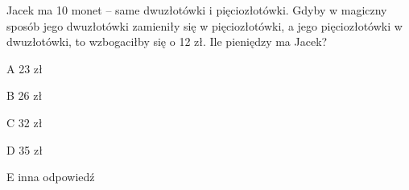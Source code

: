 \begin{tresc}
Jacek ma 10 monet – same dwuzłotówki i pięciozłotówki. Gdyby w magiczny sposób jego dwuzłotówki zamieniły się w pięciozłotówki, a jego pięciozłotówki w dwuzłotówki, to wzbogaciłby się o 12 zł. Ile pieniędzy ma Jacek?
\end{tresc}
\begin{wariant}{A} 23 zł \end{wariant}
\begin{wariant}{B} 26 zł \end{wariant}
\begin{wariant}{C} 32 zł \end{wariant}
\begin{wariant}{D} 35 zł \end{wariant}
\begin{wariant}{E} inna odpowiedź \end{wariant}

